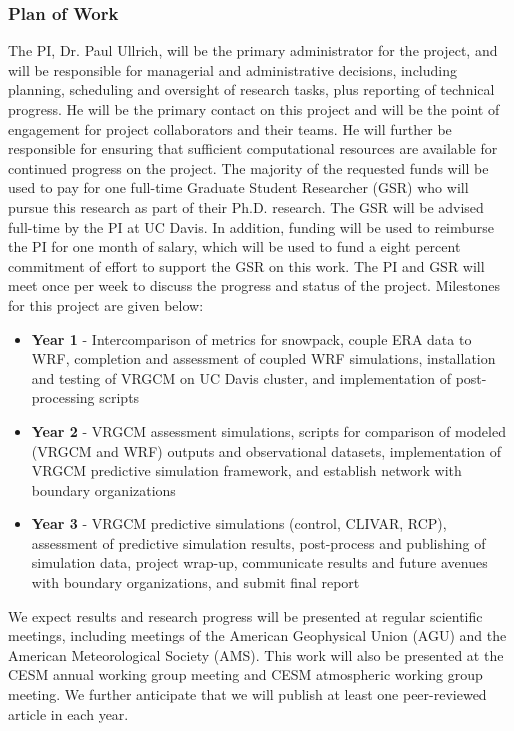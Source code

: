 \documentclass[11pt]{article}
\begin{document}
\subsubsection{Plan of Work}
The PI, Dr. Paul Ullrich, will be the primary administrator for the project, and will be responsible for managerial and administrative decisions, including planning, scheduling and oversight of research tasks, plus reporting of technical progress. He will be the primary contact on this project and will be the point of engagement for project collaborators and their teams. He will further be responsible for ensuring that sufficient computational resources are available for continued progress on the project. The majority of the requested funds will be used to pay for one full-time Graduate Student Researcher (GSR) who will pursue this research as part of their Ph.D. research. The GSR will be advised full-time by the PI at UC Davis. In addition, funding will be used to reimburse the PI for one month of salary, which will be used to fund a eight percent commitment of effort to support the GSR on this work. The PI and GSR will meet once per week to discuss the progress and status of the project. Milestones for this project are given below:

\begin{itemize}
  \item \textbf{Year 1} - Intercomparison of metrics for snowpack, couple ERA data to WRF, completion and assessment of coupled WRF simulations, installation and testing of VRGCM on UC Davis cluster, and implementation of post-processing scripts
  \item \textbf{Year 2} - VRGCM assessment simulations, scripts for comparison of modeled (VRGCM and WRF) outputs and observational datasets, implementation of VRGCM predictive simulation framework, and establish network with boundary organizations
  \item \textbf{Year 3} - VRGCM predictive simulations (control, CLIVAR, RCP), assessment of predictive simulation results, post-process and publishing of simulation data, project wrap-up, communicate results and future avenues with boundary organizations, and submit final report
\end{itemize}

We expect results and research progress will be presented at regular scientific meetings, including meetings of the American Geophysical Union (AGU) and the American Meteorological Society (AMS). This work will also be presented at the CESM annual working group meeting and CESM atmospheric working group meeting. We further anticipate that we will publish at least one peer-reviewed article in each year.
\end{document}
